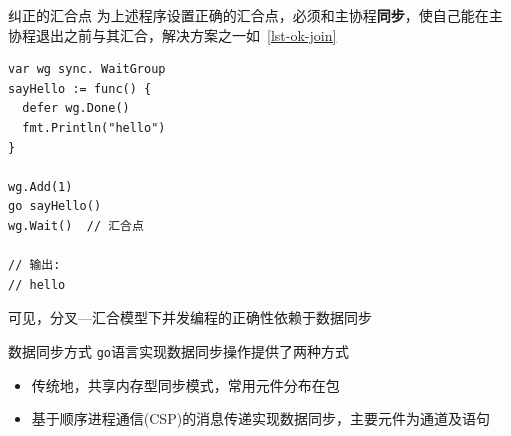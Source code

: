 \begin{frame}[fragile]{纠正的汇合点}
为上述程序设置正确的汇合点，必须和主协程\textbf{同步}，使自己能在主协程退出之前与其汇合，解决方案之一如\lstlistingname~\ref{lst-ok-join}

\begin{lstlisting}[caption={利用同步确保\code{sayHello}在主协程退出之前与其汇合},label=lst-ok-join]
var wg sync. WaitGroup
sayHello := func() {
  defer wg.Done()
  fmt.Println("hello")
}

wg.Add(1)
go sayHello()
wg.Wait()  // 汇合点

// 输出:
// hello    
\end{lstlisting}

\alert{可见，分叉---汇合模型下并发编程的正确性依赖于数据同步}
\end{frame}

\begin{frame}{数据同步方式}
\texttt{go}语言实现数据同步操作提供了两种方式
\begin{itemize}
    \item 传统地，\alert{共享内存型同步模式}，常用元件分布在包
    \item \alert{基于顺序进程通信(CSP)}的消息传递实现数据同步，主要元件为通道\channel 及\select 语句
\end{itemize}
\end{frame}